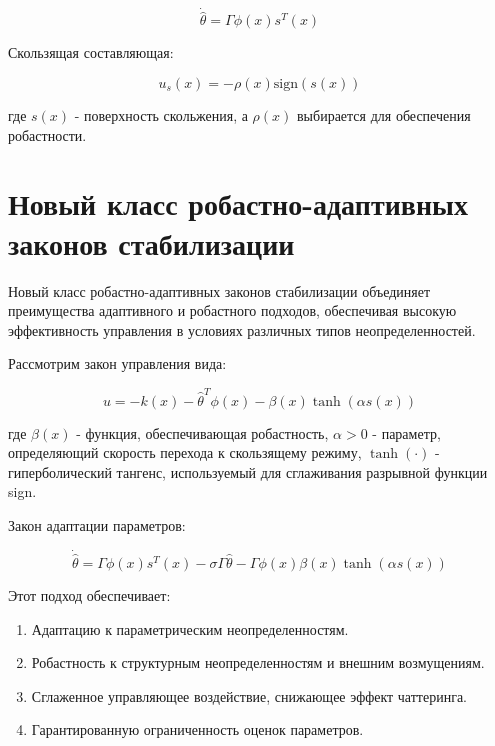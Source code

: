 \documentclass[a4paper,14pt]{extarticle} %
\begin{document}
\begin{equation}
\dot{\hat{\theta}} = \Gamma\phi(x)s^T(x)
\end{equation}

Скользящая составляющая:

\begin{equation}
u_s(x) = -\rho(x)\text{sign}(s(x))
\end{equation}

где $s(x)$ - поверхность скольжения, а $\rho(x)$ выбирается для обеспечения робастности.

\section{Новый класс робастно-адаптивных законов стабилизации}

Новый класс робастно-адаптивных законов стабилизации объединяет преимущества адаптивного и робастного подходов, обеспечивая высокую эффективность управления в условиях различных типов неопределенностей.

Рассмотрим закон управления вида:

\begin{equation}
u = -k(x) - \hat{\theta}^T\phi(x) - \beta(x)\tanh(\alpha s(x))
\end{equation}

где $\beta(x)$ - функция, обеспечивающая робастность, $\alpha > 0$ - параметр, определяющий скорость перехода к скользящему режиму, $\tanh(\cdot)$ - гиперболический тангенс, используемый для сглаживания разрывной функции sign.

Закон адаптации параметров:

\begin{equation}
\dot{\hat{\theta}} = \Gamma\phi(x)s^T(x) - \sigma\Gamma\hat{\theta} - \Gamma\phi(x)\beta(x)\tanh(\alpha s(x))
\end{equation}

Этот подход обеспечивает:

\begin{enumerate}
    \item Адаптацию к параметрическим неопределенностям.
    \item Робастность к структурным неопределенностям и внешним возмущениям.
    \item Сглаженное управляющее воздействие, снижающее эффект чаттеринга.
    \item Гарантированную ограниченность оценок параметров.
\end{enumerate}
\end{document}

